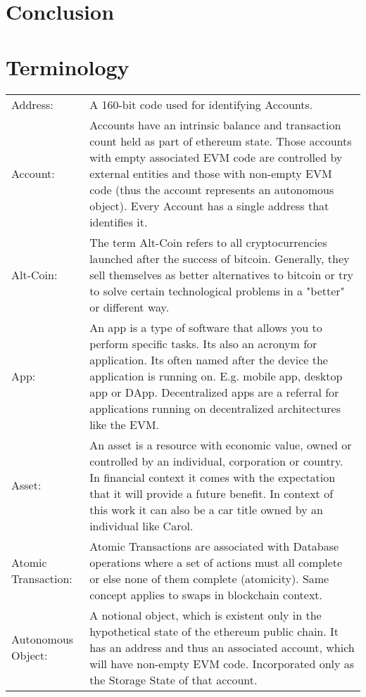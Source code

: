 \chapter{Conclusion}
\label{ch:chapter07}


\chapter{Terminology}
\label{ch:chapter08}

\begin{center}
	\begin{tabular}{ p{4cm} p{8cm} } 
		Address: & A 160-bit code used for identifying Accounts.  \\ 
		Account: & Accounts have an intrinsic balance and transaction count held as part of ethereum state. Those accounts with empty associated \ac{EVM} code are controlled by external entities and those with non-empty \ac{EVM} code (thus the account represents an autonomous object). Every Account has a single address that identifies it. \\
		Alt-Coin: & The term Alt-Coin refers to all cryptocurrencies launched after the success of bitcoin. Generally, they sell themselves as better alternatives to bitcoin or try to solve certain technological problems in a "better" or different way. \\
		App: & An app is a type of software that allows you to perform specific tasks. Its also an acronym for application. Its often named after the device the application is running on. E.g. mobile app, desktop app or \ac{DApp}. Decentralized apps are a referral for applications running on decentralized architectures like the \ac{EVM}. \\
		Asset: & An asset is a resource with economic value, owned or controlled by an individual, corporation or country. In financial context it comes with the expectation that it will provide a future benefit. In context of this work it can also be a car title owned by an individual like Carol.\\
		Atomic Transaction: & Atomic Transactions are associated with Database operations where a set of actions must all complete or else none of them complete (atomicity). Same concept applies to swaps in blockchain context. \\
		Autonomous Object: & A notional object, which is existent only in the hypothetical state of the ethereum public chain. It has an address and thus an associated account, which will have non-empty \ac{EVM} code. Incorporated only as the Storage State of that account. \\
	\end{tabular}
\end{center}

